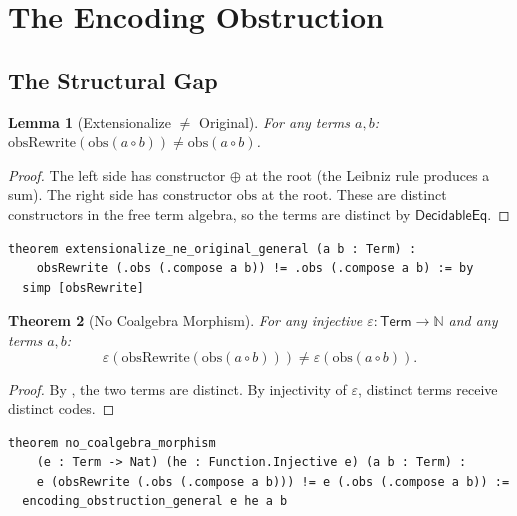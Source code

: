 \documentclass[11pt,a4paper]{article}
\newtheorem{theorem}{Theorem}[section]
\newtheorem{lemma}[theorem]{Lemma}
\theoremstyle{definition}
\theoremstyle{remark}
\newcommand{\compose}{\mathbin{\circ}}
\newcommand{\opl}{\oplus}
\newcommand{\obs}{\mathrm{obs}}
\newcommand{\Term}{\mathsf{Term}}
\newcommand{\obsRewrite}{\mathrm{obsRewrite}}
\newcommand{\N}{\mathbb{N}}
\begin{document}
\section{The Encoding Obstruction}
\label{sec:obstruction}

\subsection{The Structural Gap}

\begin{lemma}[Extensionalize $\neq$ Original]
\label{lem:ext-ne-orig}
For any terms $a, b$:
$\obsRewrite(\obs(a \compose b)) \neq \obs(a \compose b)$.
\end{lemma}

\begin{proof}
The left side has constructor $\opl$ at the root (the Leibniz rule produces
a sum). The right side has constructor $\obs$ at the root. These are
distinct constructors in the free term algebra, so the terms are distinct by
$\mathsf{DecidableEq}$.
\end{proof}

\begin{lstlisting}[caption={General structural gap (Obstruction/Encoding.lean)}]
theorem extensionalize_ne_original_general (a b : Term) :
    obsRewrite (.obs (.compose a b)) != .obs (.compose a b) := by
  simp [obsRewrite]
\end{lstlisting}

\begin{theorem}[No Coalgebra Morphism]
\label{thm:no-coalgebra}
For any injective $\varepsilon : \Term \to \N$ and any terms $a, b$:
\[
  \varepsilon(\obsRewrite(\obs(a \compose b)))
  \neq \varepsilon(\obs(a \compose b)).
\]
\end{theorem}

\begin{proof}
By , the two terms are distinct. By injectivity of
$\varepsilon$, distinct terms receive distinct codes.
\end{proof}

\begin{lstlisting}[caption={Main theorem (Obstruction/Main.lean)}]
theorem no_coalgebra_morphism
    (e : Term -> Nat) (he : Function.Injective e) (a b : Term) :
    e (obsRewrite (.obs (.compose a b))) != e (.obs (.compose a b)) :=
  encoding_obstruction_general e he a b
\end{lstlisting}
\end{document}
